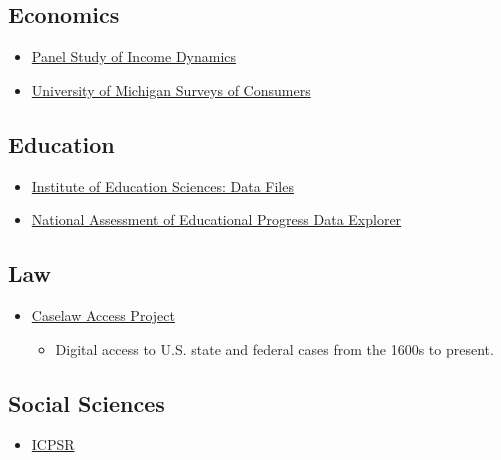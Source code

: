 \documentclass[]{book}
\providecommand{\tightlist}{%
  \setlength{\itemsep}{0pt}\setlength{\parskip}{0pt}}
\begin{document}
\hypertarget{economics}{%
\subsection{Economics}\label{economics}}

\begin{itemize}
\tightlist
\item
  \href{https://psidonline.isr.umich.edu/}{Panel Study of Income Dynamics}
\item
  \href{http://www.sca.isr.umich.edu/}{University of Michigan Surveys of Consumers}
\end{itemize}

\hypertarget{education}{%
\subsection{Education}\label{education}}

\begin{itemize}
\tightlist
\item
  \href{https://ies.ed.gov/data.asp}{Institute of Education Sciences: Data Files}
\item
  \href{https://www.nationsreportcard.gov/ndecore/landing}{National Assessment of Educational Progress Data Explorer}
\end{itemize}

\hypertarget{law}{%
\subsection{Law}\label{law}}

\begin{itemize}
\tightlist
\item
  \href{https://case.law/}{Caselaw Access Project}

  \begin{itemize}
  \tightlist
  \item
    Digital access to U.S. state and federal cases from the 1600s to present.
  \end{itemize}
\end{itemize}

\hypertarget{social-sciences-1}{%
\subsection{Social Sciences}\label{social-sciences-1}}

\begin{itemize}
\tightlist
\item
  \href{https://www.icpsr.umich.edu/icpsrweb/ICPSR/}{ICPSR}
\end{itemize}
\end{document}
